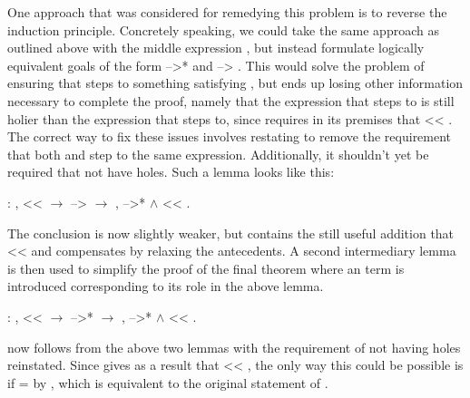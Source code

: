 \documentclass[12pt]{report}
\begin{document}
 One approach that was considered for remedying this problem is
to reverse the induction principle. Concretely speaking, we could
take the same approach as outlined above with the middle expression
, but instead formulate logically equivalent goals of the form 
-->*  and  --> . This would solve the problem of ensuring that
 steps to something satisfying , but ends up losing other
information necessary to complete the proof, namely that the
expression  that  steps to is still holier than the expression
 that  steps to, since  requires in
its premises that  << . The correct way to fix these issues
involves restating  to remove the
requirement that both  and  step to the same
expression. Additionally, it shouldn't yet be required that  not
have holes. Such a lemma looks like this: \begin{coqdoccode}
\coqdocemptyline
\coqdocemptyline
\coqdocindent{1.00em}
  : \coqdockw{\ensuremath{\forall}}   ,\coqdoceol
\coqdocindent{2.00em}
 <<  \ensuremath{\rightarrow}\coqdoceol
\coqdocindent{2.00em}
 -->  \ensuremath{\rightarrow}\coqdoceol
\coqdocindent{2.00em}
\coqdoctac{\ensuremath{\exists}} ,  -->*  \ensuremath{\land}  << .\coqdoceol
\coqdocemptyline
\end{coqdoccode}
The conclusion is now slightly weaker, but contains the still
useful addition that  <<  and compensates by relaxing the
antecedents. A second intermediary lemma is then used to simplify the
proof of the final  theorem where an  term is
introduced corresponding to its role in the above lemma. \begin{coqdoccode}
\coqdocemptyline
\coqdocindent{1.00em}
  : \coqdockw{\ensuremath{\forall}}   ,\coqdoceol
\coqdocindent{2.00em}
 <<  \ensuremath{\rightarrow}\coqdoceol
\coqdocindent{2.00em}
 -->*  \ensuremath{\rightarrow}\coqdoceol
\coqdocindent{2.00em}
\coqdoctac{\ensuremath{\exists}} ,  -->*  \ensuremath{\land}  << .\coqdoceol
\coqdocemptyline
\end{coqdoccode}
 now follows from the above two lemmas with the
requirement of  not having holes reinstated. Since 
gives as a result that  << , the only way this could be possible
is if  =  by , which is equivalent to
the original statement of . 
\end{document}
